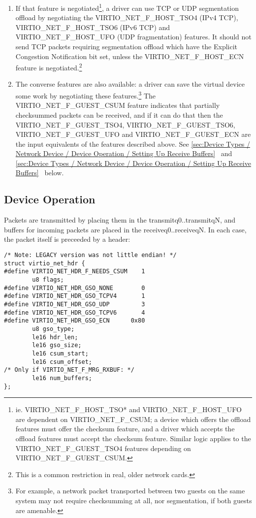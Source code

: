 \begin{enumerate}
\item If that feature is negotiated\footnote{ie. VIRTIO_NET_F_HOST_TSO* and VIRTIO_NET_F_HOST_UFO are
dependent on VIRTIO_NET_F_CSUM; a device which offers the offload
features must offer the checksum feature, and a driver which
accepts the offload features must accept the checksum feature.
Similar logic applies to the VIRTIO_NET_F_GUEST_TSO4 features
depending on VIRTIO_NET_F_GUEST_CSUM.
}, a driver can use TCP or UDP
  segmentation offload by negotiating the VIRTIO_NET_F_HOST_TSO4 (IPv4
  TCP), VIRTIO_NET_F_HOST_TSO6 (IPv6 TCP) and VIRTIO_NET_F_HOST_UFO
  (UDP fragmentation) features. It should not send TCP packets
  requiring segmentation offload which have the Explicit Congestion
  Notification bit set, unless the VIRTIO_NET_F_HOST_ECN feature is
  negotiated.\footnote{This is a common restriction in real, older network cards.
}

\item The converse features are also available: a driver can save
  the virtual device some work by negotiating these features.\footnote{For example, a network packet transported between two guests on
the same system may not require checksumming at all, nor segmentation,
if both guests are amenable.
}
   The VIRTIO_NET_F_GUEST_CSUM feature indicates that partially
  checksummed packets can be received, and if it can do that then
  the VIRTIO_NET_F_GUEST_TSO4, VIRTIO_NET_F_GUEST_TSO6,
  VIRTIO_NET_F_GUEST_UFO and VIRTIO_NET_F_GUEST_ECN are the input
  equivalents of the features described above.
  See \ref{sec:Device Types / Network Device / Device Operation / Setting Up Receive Buffers}~ and \ref{sec:Device Types / Network Device / Device Operation / Setting Up Receive Buffers}~ below.
\end{enumerate}

\subsection{Device Operation}\label{sec:Device Types / Network Device / Device Operation}

Packets are transmitted by placing them in the
transmitq0..transmitqN, and buffers for incoming packets are
placed in the receiveq0..receiveqN. In each case, the packet
itself is preceeded by a header:

\begin{lstlisting}
/* Note: LEGACY version was not little endian! */
struct virtio_net_hdr {
#define VIRTIO_NET_HDR_F_NEEDS_CSUM    1
        u8 flags;
#define VIRTIO_NET_HDR_GSO_NONE        0
#define VIRTIO_NET_HDR_GSO_TCPV4       1
#define VIRTIO_NET_HDR_GSO_UDP         3
#define VIRTIO_NET_HDR_GSO_TCPV6       4
#define VIRTIO_NET_HDR_GSO_ECN      0x80
        u8 gso_type;
        le16 hdr_len;
        le16 gso_size;
        le16 csum_start;
        le16 csum_offset;
/* Only if VIRTIO_NET_F_MRG_RXBUF: */
        le16 num_buffers;
};
\end{lstlisting}

